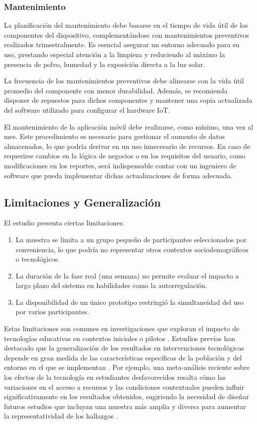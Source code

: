 			\subsubsection{Mantenimiento}		
				La planificación del mantenimiento debe basarse en el tiempo de vida útil de los componentes del dispositivo, complementándose con mantenimientos preventivos realizados trimestralmente. Es esencial asegurar un entorno adecuado para su uso, prestando especial atención a la limpieza y reduciendo al máximo la presencia de polvo, humedad y la exposición directa a la luz solar.
				
				La frecuencia de los mantenimientos preventivos debe alinearse con la vida útil promedio del componente con menor durabilidad. Además, se recomienda disponer de repuestos para dichos componentes y mantener una copia actualizada del software utilizado para configurar el hardware IoT.
				
				El mantenimiento de la aplicación móvil debe realizarse, como mínimo, una vez al mes. Este procedimiento es necesario para gestionar el aumento de datos almacenados, lo que podría derivar en un uso innecesario de recursos. En caso de requerirse cambios en la lógica de negocios o en los requisitos del usuario, como modificaciones en los reportes, será indispensable contar con un ingeniero de software que pueda implementar dichas actualizaciones de forma adecuada.
				
		\subsection{Limitaciones y Generalización}
			El estudio presenta ciertas limitaciones:
			
			\begin{enumerate}
				\item La muestra se limita a un grupo pequeño de participantes seleccionados por conveniencia, lo que podría no representar otros contextos sociodemográficos o tecnológicos.
				\item La duración de la fase real (una semana) no permite evaluar el impacto a largo plazo del sistema en habilidades como la autorregulación.
				\item La disponibilidad de un único prototipo restringió la simultaneidad del uso por varios participantes.
			\end{enumerate}
			
			Estas limitaciones son comunes en investigaciones que exploran el impacto de tecnologías educativas en contextos iniciales o pilotos \citep{Gregg2021Promissing,Jonsson2004Appropriating}. Estudios previos han destacado que la generalización de los resultados en intervenciones tecnológicas depende en gran medida de las características específicas de la población y del entorno en el que se implementan \citep{Song2013Development}. Por ejemplo, una meta-análisis reciente sobre los efectos de la tecnología en estudiantes desfavorecidos resalta cómo las variaciones en el acceso a recursos y las condiciones contextuales pueden influir significativamente en los resultados obtenidos, sugiriendo la necesidad de diseñar futuros estudios que incluyan una muestra más amplia y diversa para aumentar la representatividad de los hallazgos \citep{DiPietro2025Meta}.
			
